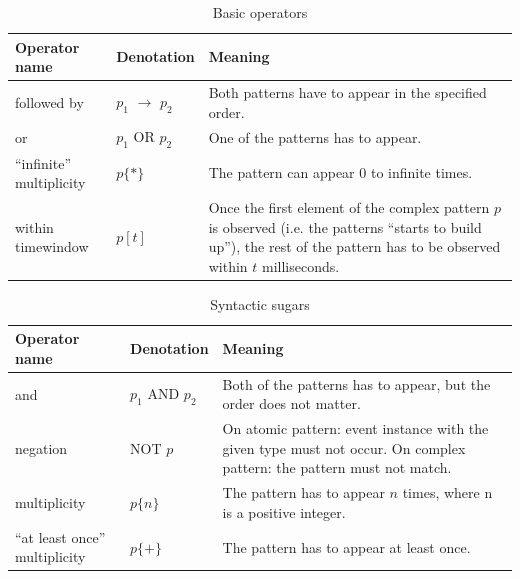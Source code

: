 \begin{table}
	\caption{Basic operators}		
	\label{tab:cep:veplop}
	\begin{tabularx}{\textwidth}{llX}
		\toprule
		Operator name             & Denotation                & Meaning                                                                                                                                                                       \\ \midrule
		followed by               & $p_1$ $\rightarrow$ $p_2$ & Both patterns have to appear in the specified order.                                                                                                                          \\
		or                        & $p_1$ OR $p_2$            & One of the patterns has to appear.                                                                                                                                            \\
		``infinite'' multiplicity & $p\{{\ast}\}$             & The pattern can appear 0 to infinite times.                                                                                                                                   \\
		within timewindow         & $p[t]$                    & Once the first element of the complex pattern $p$ is observed (i.e. the patterns ``starts to build up''), the rest of the pattern has to be observed within $t$ milliseconds. \\ \bottomrule
	\end{tabularx}
\end{table}

\begin{table}
	\caption{Syntactic sugars}		
	\label{tab:cep:veplsugar}
	\begin{tabularx}{\textwidth}{llX}
		\toprule
		Operator name                  & Denotation      & Meaning                                                                                                               \\ \midrule
		and                            & $p_1$ AND $p_2$ & Both of the patterns has to appear, but the order does not matter.                                                    \\
		negation                       & NOT $p$         & On atomic pattern: event instance with the given type must not occur. On complex pattern: the pattern must not match. \\
		multiplicity                   & $p\{n\}$        & The pattern has to appear $n$ times, where n is a positive integer.                                                   \\
		``at least once'' multiplicity & $p\{+\}$        & The pattern has to appear at least once.                                                                              \\ \bottomrule
	\end{tabularx}
\end{table}

